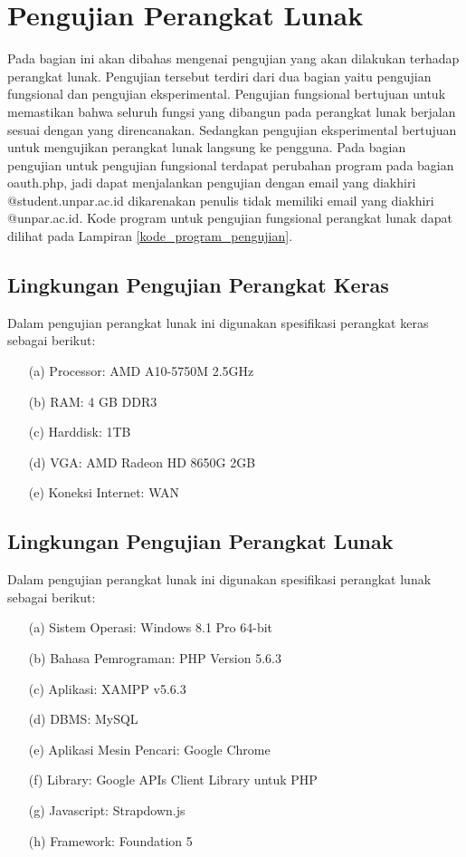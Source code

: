 \section{Pengujian Perangkat Lunak}
\label{sec:pengujianperangkatlunak}

Pada bagian ini akan dibahas mengenai pengujian yang akan dilakukan terhadap perangkat lunak. Pengujian tersebut terdiri dari dua bagian yaitu pengujian fungsional dan pengujian eksperimental. Pengujian fungsional bertujuan untuk memastikan bahwa seluruh fungsi yang dibangun pada perangkat lunak berjalan sesuai dengan yang direncanakan. Sedangkan pengujian eksperimental bertujuan untuk mengujikan perangkat lunak langsung ke pengguna. Pada bagian pengujian untuk pengujian fungsional terdapat perubahan program pada bagian oauth.php, jadi dapat menjalankan pengujian dengan email yang diakhiri @student.unpar.ac.id dikarenakan penulis tidak memiliki email yang diakhiri @unpar.ac.id. Kode program untuk pengujian fungsional perangkat lunak dapat dilihat pada Lampiran \ref{kode_program_pengujian}.

\subsection{Lingkungan Pengujian Perangkat Keras}
\label{sec:lingkunganpengujianperangkatkeras}

Dalam pengujian perangkat lunak ini digunakan spesifikasi perangkat keras sebagai berikut:

\begin{enumerate}
\item[(a)] Processor: AMD A10-5750M 2.5GHz
\item[(b)] RAM: 4 GB DDR3
\item[(c)] Harddisk: 1TB
\item[(d)] VGA: AMD Radeon HD 8650G 2GB
\item[(e)] Koneksi Internet: WAN
\end{enumerate}

\subsection{Lingkungan Pengujian Perangkat Lunak}
\label{sec:lingkunganpengujianperangkatlunak}

Dalam pengujian perangkat lunak ini digunakan spesifikasi perangkat lunak sebagai berikut:

\begin{enumerate}
\item[(a)] Sistem Operasi: Windows 8.1 Pro 64-bit
\item[(b)] Bahasa Pemrograman: PHP Version 5.6.3
\item[(c)] Aplikasi: XAMPP v5.6.3
\item[(d)] DBMS: MySQL
\item[(e)] Aplikasi Mesin Pencari: Google Chrome
\item[(f)] Library: Google APIs Client Library untuk PHP
\item[(g)] Javascript: Strapdown.js
\item[(h)] Framework: Foundation 5
\end{enumerate}

